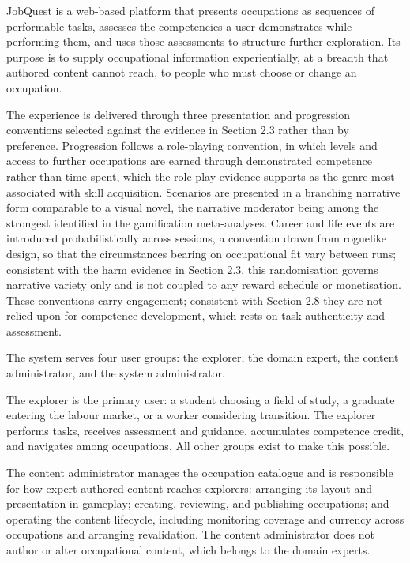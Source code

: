 JobQuest is a web-based platform that presents occupations as sequences of performable tasks, assesses the competencies a user demonstrates while performing them, and uses those assessments to structure further exploration. Its purpose is to supply occupational information experientially, at a breadth that authored content cannot reach, to people who must choose or change an occupation.

The experience is delivered through three presentation and progression conventions selected against the evidence in Section 2.3 rather than by preference. Progression follows a role-\allowbreak{}playing convention, in which levels and access to further occupations are earned through demonstrated competence rather than time spent, which the role-play evidence supports as the genre most associated with skill acquisition. Scenarios are presented in a branching narrative form comparable to a visual novel, the narrative moderator being among the strongest identified in the gamification meta-\allowbreak{}analyses. Career and life events are introduced probabilistically across sessions, a convention drawn from roguelike design, so that the circumstances bearing on occupational fit vary between runs; consistent with the harm evidence in Section 2.3, this randomisation governs narrative variety only and is not coupled to any reward schedule or monetisation. These conventions carry engagement; consistent with Section 2.8 they are not relied upon for competence development, which rests on task authenticity and assessment.

The system serves four user groups: the explorer, the domain expert, the content administrator, and the system administrator.

The explorer is the primary user: a student choosing a field of study, a graduate entering the labour market, or a worker considering transition. The explorer performs tasks, receives assessment and guidance, accumulates competence credit, and navigates among occupations. All other groups exist to make this possible.

The content administrator manages the occupation catalogue and is responsible for how expert-\allowbreak{}authored content reaches explorers: arranging its layout and presentation in gameplay; creating, reviewing, and publishing occupations; and operating the content lifecycle, including monitoring coverage and currency across occupations and arranging revalidation. The content administrator does not author or alter occupational content, which belongs to the domain experts.

